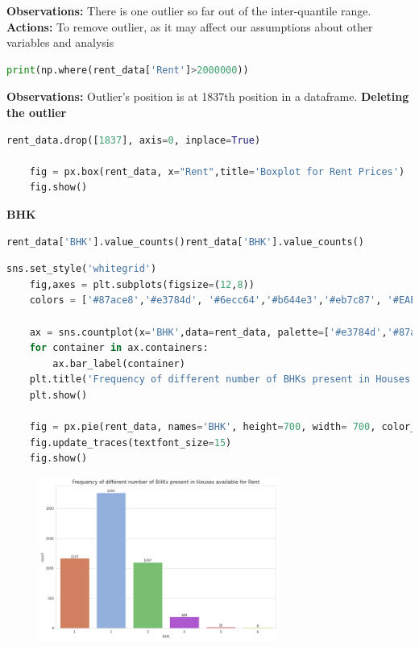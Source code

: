\noindent\textbf{Observations:}
There is one outlier so far out of the inter-quantile range.
\medskip
\noindent\textbf{Actions:}
To remove outlier, as it may affect our assumptions about other variables and analysis

\begin{lstlisting}[language=python]
    print(np.where(rent_data['Rent']>2000000))
\end{lstlisting}

\noindent\textbf{Observations:}
Outlier's position is at 1837th position in a dataframe.
\medskip
\noindent\textbf{Deleting the outlier}
\begin{lstlisting}[language=python]
    rent_data.drop([1837], axis=0, inplace=True)

    fig = px.box(rent_data, x="Rent",title='Boxplot for Rent Prices')
    fig.show()
\end{lstlisting}

\noindent\textbf{BHK}
\begin{lstlisting}[language=python]
    rent_data['BHK'].value_counts()rent_data['BHK'].value_counts()
\end{lstlisting}


\begin{lstlisting}[language=python]
    sns.set_style('whitegrid')
    fig,axes = plt.subplots(figsize=(12,8))
    colors = ['#87ace8','#e3784d', '#6ecc64','#b644e3','#eb7c87', '#EAE509']
    
    ax = sns.countplot(x='BHK',data=rent_data, palette=['#e3784d','#87ace8', '#6ecc64','#b644e3','#eb7c87','#EAE509'])
    for container in ax.containers:
        ax.bar_label(container)
    plt.title('Frequency of different number of BHKs present in Houses available for Rent',fontsize=15)
    plt.show()
    
    fig = px.pie(rent_data, names='BHK', height=700, width= 700, color_discrete_sequence=px.colors.sequential.deep, title='Pie Chart for different number of BHKs present in Houses available for Rent')
    fig.update_traces(textfont_size=15)
    fig.show()
\end{lstlisting}

\begin{figure}[h]
    \centering
    \includegraphics[width=0.7\textwidth]{Images/bhkfreq.png}
\end{figure}


